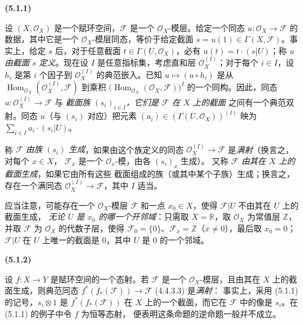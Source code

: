 \documentclass[UTF8,fontset=none,11pt,oneside,openany]{ctexbook}
\newenvironment{env}[1][]{%
  \par\medskip\noindent\textbf{(#1)}\ %
}{\par}
\newcommand{\oldpage}[2][]{%
  \hypertarget{ega-source-page-#1-#2}{}%
  \marginnote{\scriptsize\textbf{#1}~|~#2}\ignorespaces}
\let\EGAOriginalLabel\label
\renewcommand{\label}[1]{\phantomsection\EGAOriginalLabel{#1}}
\begin{document}
\begin{env}[5.1.1]
\label{0.5.1.1-fr}
设 $(X,\mathcal{O}_X)$ 是一个赋环空间，$\mathcal{F}$ 是一个
$\mathcal{O}_X$-模层。给定一个同态
$u:\mathcal{O}_X\to\mathcal{F}$ 的数据，其中它是一个
$\mathcal{O}_X$-模层同态，等价于给定截面
$s=u(1)\in\Gamma(X,\mathcal{F})$。事实上，给定 $s$ 后，对于任意截面
$t\in\Gamma(U,\mathcal{O}_X)$，必有 $u(t)=t\cdot(s|U)$；称 $u$
\emph{由截面 $s$ 定义}。现在设 $I$ 是任意指标集，考虑直和层
$\mathcal{O}_X^{(I)}$；对于每个 $i\in I$，设 $h_i$ 是第 $i$ 个因子到
$\mathcal{O}_X^{(I)}$ 的典范嵌入。已知 $u\mapsto(u\circ h_i)$ 是从
$\operatorname{Hom}_{\mathcal{O}_X}(\mathcal{O}_X^{(I)},\mathcal{F})$
到乘积
$\bigl(\operatorname{Hom}_{\mathcal{O}_X}(\mathcal{O}_X,\mathcal{F})\bigr)^I$
的一个同构。因此，同态
$u:\mathcal{O}_X^{(I)}\to\mathcal{F}$ 与
\emph{截面族 $(s_i)_{i\in I}$，它们是 $\mathcal{F}$ 在 $X$ 上的截面}
之间有一个典范双射。同态 $u$（与 $(s_i)$ 对应）把元素
$(a_i)\in(\Gamma(U,\mathcal{O}_X))^{(I)}$ 映为
$\sum_{i\in I}a_i\cdot(s_i|U)$。

称 $\mathcal{F}$ \emph{由族 $(s_i)$ 生成}，如果由这个族定义的同态
\oldpage[0\textsubscript{I}]{45}
$\mathcal{O}_X^{(I)}\to\mathcal{F}$ 是\emph{满射}（换言之，对每个 $x\in X$，
$\mathcal{F}_x$ 是一个 $\mathcal{O}_x$-模，由各 $(s_i)_x$ 生成）。
又称 $\mathcal{F}$ \emph{由其在 $X$ 上的截面生成}，如果它由所有这些
截面组成的族（或其中某个子族）生成；换言之，
存在一个满同态 $\mathcal{O}_X^{(I)}\to\mathcal{F}$，其中 $I$ 适当。

应当注意，可能存在一个 $\mathcal{O}_X$-模层 $\mathcal{F}$ 和一点
$x_0\in X$，使得 $\mathcal{F}|U$ 不由其在 $U$ 上的截面生成，
\emph{无论 $U$ 是 $x_0$ 的哪一个开邻域}：只需取
$X=\mathbb{R}$，取 $\mathcal{O}_X$ 为常值层 $\mathbb{Z}$，并取
$\mathcal{F}$ 为 $\mathcal{O}_X$ 的代数子层，使得
$\mathcal{F}_0=\{0\}$、$\mathcal{F}_x=\mathbb{Z}$（$x\ne0$），最后取
$x_0=0$；$\mathcal{F}|U$ 在 $U$ 上唯一的截面是 $0$，其中 $U$ 是
$0$ 的一个邻域。
\end{env}

\begin{env}[5.1.2]
\label{0.5.1.2-fr}
设 $f:X\to Y$ 是赋环空间的一个态射。若 $\mathcal{F}$ 是一个
$\mathcal{O}_X$-模层，且由其在 $X$ 上的截面生成，则典范同态
$f^*(f_*(\mathcal{F}))\to\mathcal{F}$ (4.4.3.3) 是\emph{满射}：
事实上，采用 (5.1.1) 的记号，$s_i\otimes1$ 是
$f^*(f_*(\mathcal{F}))$ 在 $X$ 上的一个截面，而它在
$\mathcal{F}$ 中的像是 $s_i$。在 (5.1.1) 的例子中令 $f$ 为恒等态射，
便表明这条命题的逆命题一般并不成立。
\end{env}
\end{document}
